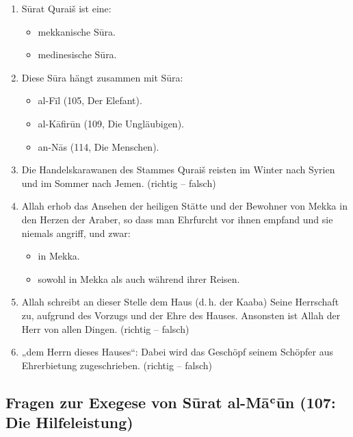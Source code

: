 \begin{enumerate}[leftmargin=1.6em,resume]
\item Sūrat Quraiš ist eine:
  \begin{itemize}
    \item mekkanische Sūra. \item medinesische Sūra.
  \end{itemize}
\item Diese Sūra hängt zusammen mit Sūra:
  \begin{itemize}
    \item al-Fīl (105, Der Elefant). \item al-Kāfirūn (109, Die Ungläubigen).
    \item an-Nās (114, Die Menschen).
  \end{itemize}
\item Die Handelskarawanen des Stammes Quraiš reisten im Winter nach Syrien und im Sommer
  nach Jemen. (richtig -- falsch)
\item Allah erhob das Ansehen der heiligen Stätte und der Bewohner von Mekka in den Herzen
  der Araber, so dass man Ehrfurcht vor ihnen empfand und sie niemals angriff, und zwar:
  \begin{itemize}
    \item in Mekka. \item sowohl in Mekka als auch während ihrer Reisen.
  \end{itemize}
\item Allah schreibt an dieser Stelle dem Haus (d.\,h. der Kaaba) Seine Herrschaft zu, aufgrund
  des Vorzugs und der Ehre des Hauses. Ansonsten ist Allah der Herr von allen Dingen.
  (richtig -- falsch)
\item „dem Herrn dieses Hauses“: Dabei wird das Geschöpf seinem Schöpfer aus Ehrerbietung
  zugeschrieben. (richtig -- falsch)
\end{enumerate}

\subsection*{Fragen zur Exegese von Sūrat al-Māʿūn (107: Die Hilfeleistung)}

